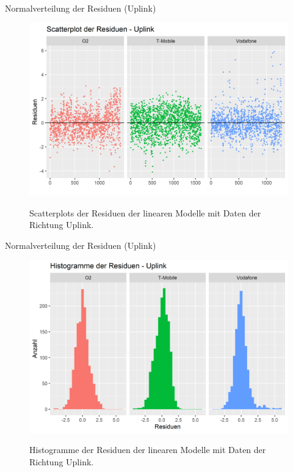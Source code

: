\begin{frame}{Normalverteilung der Residuen (Uplink)}
	\begin{figure}
		\includegraphics[scale=0.35]{plots/arima/uplink/res_scatter}\\
		\caption{Scatterplots der Residuen der linearen Modelle mit Daten der Richtung Uplink.}
		\label{res_scatter}
	\end{figure}
\end{frame}
\begin{frame}{Normalverteilung der Residuen (Uplink)}
	\begin{figure}
		\includegraphics[scale=0.35]{plots/arima/uplink/res_histogram}\\
		\caption{Histogramme der Residuen der linearen Modelle mit Daten der Richtung Uplink.}
		\label{res_histogram}
	\end{figure}
\end{frame}

